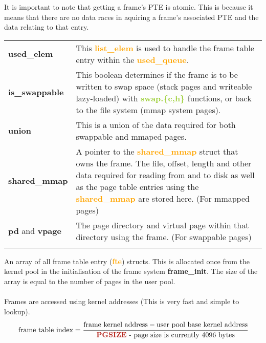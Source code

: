 \documentclass{report}
\newcommand{\fun}[1]{\textcolor{Emerald}{\textbf{#1}}}
\newcommand{\file}[1]{\textcolor{YellowGreen}{\textbf{#1}}}
\newcommand{\struct}[1]{\textcolor{orange}{\textbf{#1}}}
\newcommand{\var}[1]{\textcolor{RoyalPurple}{\textbf{#1}}}
\newcommand{\const}[1]{\textcolor{BrickRed}{\textbf{#1}}}
\newcommand{\pintoscode}[4]{}
\newcommand{\pintosfile}[3]{\pintoscode{#1}{#2}{\file{#3}}{#3}}
\begin{document}
				It is important to note that getting a frame's PTE is atomic.
				This is because it means that there are no data races in 
				aquiring a frame's associated PTE and the data relating to that
				entry.
				
				\pintosfile{11}{22}{frame.c}
				\begin{center}
					\begin{tabular}{l p{10cm}}
						\vspace*{2mm}
						\var{used\_elem} & This \struct{list\_elem} is used to 
						handle the frame table entry within the 
						\struct{used\_queue}. \\ \vspace*{2mm}

						\var{is\_swappable}  & This boolean determines if the 
						frame is to be written to swap space (stack pages and 
						writeable lazy-loaded) with \file{swap.\{c,h\}} 
						functions, or back to the file system (mmap system 
						pages). \\ \vspace*{2mm}

						\const{union}  & This is a union of the data required 
						for both swappable and mmaped pages.  \\ \vspace*{2mm}

						\var{shared\_mmap}  & A pointer to the 
						\struct{shared\_mmap} struct that owns the frame. The 
						file, offset, 
						length and other data required for reading from and to disk as well 
						as the page table entries using the \struct{shared\_mmap} are stored
						here. (For mmapped pages)
						\\ \vspace*{2mm}

						\var{pd} and \var{vpage}  & The page directory and virtual page 
						within that directory using the frame. (For swappable pages) 
						\\ \vspace*{2mm}
					\end{tabular}
				\end{center}
				
				\pintosfile{38}{38}{frame.c}
				An array of all frame table entry (\struct{fte}) structs. 
				This is allocated once from the kernel pool in the initialisation of the 
				frame system \fun{frame\_init}. The size of the array is equal to the number
				of pages in the user pool.
				\\
				\\ Frames are accessed using kernel addresses (This is very fast and 
				simple to lookup).
				\[\text{frame table index} = \cfrac{\text{frame kernel address} - 
				\text{user pool base kernel address}}{\text{\const{PGSIZE} - 
				page size is currently 4096 bytes}}\]
				
\end{document}
